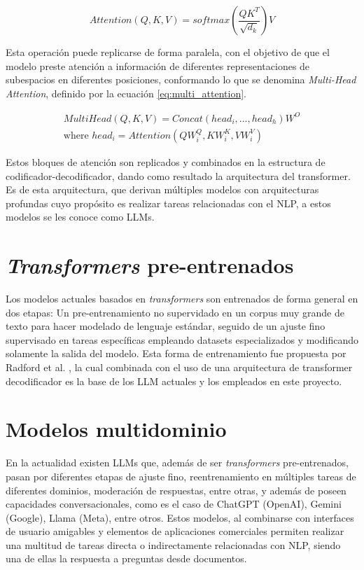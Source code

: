 \begin{equation}\label{eq:attention}
    Attention(Q,K,V) = softmax(\frac{QK^T}{\sqrt{d_k}})V
\end{equation}

Esta operación puede replicarse de forma paralela, con el objetivo de que el
modelo preste atención a información de diferentes representaciones de
subespacios en diferentes posiciones, conformando lo que se denomina
\textit{Multi-Head Attention}, definido por la ecuación \ref{eq:multi_attention}.

\begin{equation}\label{eq:multi_attention}
    \begin{split}
        MultiHead(Q,K,V) = Concat(head_i, ..., head_h)W^O \\
        \text{where } head_i = Attention(QW_i^Q, KW_i^K, VW_i^V)
    \end{split}
\end{equation}

Estos bloques de atención son replicados y combinados en la estructura de
codificador-decodificador, dando como resultado la arquitectura del transformer.
Es de esta arquitectura, que derivan múltiples modelos
con arquitecturas profundas cuyo propósito es realizar tareas relacionadas
con el NLP, a estos modelos se les conoce como LLMs.

\section{\textit{Transformers} pre-entrenados}

Los modelos actuales basados en \textit{transformers} son entrenados de forma
general en dos etapas: Un pre-entrenamiento no supervidado en un corpus
muy grande de texto para hacer modelado de lenguaje estándar, seguido de
un ajuste fino supervisado en tareas específicas empleando datasets
especializados y modificando solamente la salida del modelo. Esta forma de
entrenamiento fue propuesta por Radford et al. \cite{radford_improving_2018},
la cual combinada con el uso de una arquitectura de transformer decodificador
\cite{liu_generating_2018} es la base de los LLM actuales y los empleados en
este proyecto.

\section{Modelos multidominio}

En la actualidad existen LLMs que, además de ser \textit{transformers}
pre-entrenados, pasan por diferentes etapas de ajuste fino, reentrenamiento
en múltiples tareas de diferentes dominios, moderación de respuestas, entre
otras, y además de poseen capacidades conversacionales, como es el caso de
ChatGPT (OpenAI), Gemini (Google), Llama (Meta), entre otros.
Estos modelos, al combinarse con interfaces de usuario amigables y
elementos de aplicaciones comerciales permiten realizar una multitud de
tareas directa o indirectamente relacionadas con NLP, siendo una de ellas
la respuesta a preguntas desde documentos.

